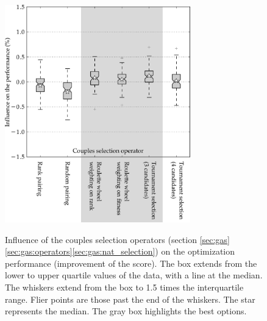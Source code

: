 \documentclass{ametsoc}
\begin{document}
\begin{figure}[t]
	\begin{center}
		\noindent\includegraphics[width=19pc,angle=0]{fig07.pdf}\\
	\end{center}
	\caption{Influence of the couples selection operators (section \ref{sec:gas}\ref{sec:gas:operators}\ref{sec:gas:nat_selection}) on the optimization performance (improvement of the score). The box extends from the lower to upper quartile values of the data, with a line at the median. The whiskers extend from the box to 1.5 times the interquartile range. Flier points are those past the end of the whiskers. The star represents the median. The gray box highlights the best options.}
	\label{fig:operator_selectcoupl_score}
\end{figure}
\end{document}
